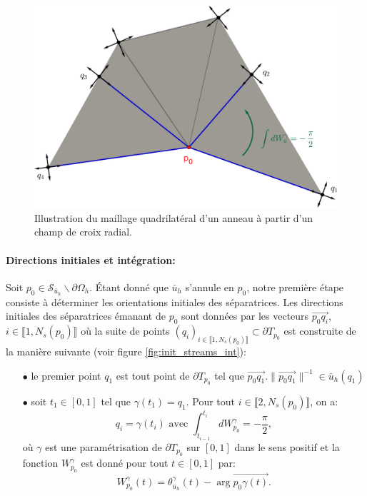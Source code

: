 \begin{figure}[!h]
\centering
\includegraphics[scale=0.755]{images/triangle separatrices bord.png}
\caption{Illustration du maillage quadrilatéral d'un anneau à partir d'un champ de croix radial.}
\label{fig:init_streams_bord}
\end{figure}

\paragraph{Directions initiales et intégration:}

Soit $p_0\in\mathcal{S}_{\bar{u}_h}\backslash\partial\Omega_h$. Étant donné que $\bar{u}_h$ s'annule en $p_0$, notre première étape consiste à déterminer les orientations initiales des séparatrices. Les directions initiales des séparatrices émanant de $p_0$ sont données par les vecteurs $\overrightarrow{p_0q_i}$, $i\in\llbracket 1, N_s(p_0) \rrbracket$ où la suite de points $(q_i)_{i\in\llbracket 1, N_s(p_0)\rrbracket}\subset\partial T_{p_0}$ est construite de la manière suivante (voir figure \ref{fig:init_streams_int}):\\
\begin{itemize}
    \item[$\bullet$] le premier point $q_1$ est tout point de $\partial T_{p_0}$ tel que $\overrightarrow{p_0q_1}.\|\overrightarrow{p_0q_1}\|^{-1}\in\bar{u}_h(q_1)$\\
    \item[$\bullet$] soit $t_1\in[0, 1]$ tel que $\gamma(t_1)=q_1$. Pour tout $i\in\llbracket 2, N_s(p_0)\rrbracket$, on a:
    $$
    q_i=\gamma(t_i)\mbox{ avec }\int_{t_{i-1}}^{t_i}dW_{p_0}^\gamma=-\frac{\pi}{2},
    $$
    où $\gamma$ est une paramétrisation de $\partial T_{p_0}$ sur $[0, 1]$ dans le sens positif et la fonction $W^\gamma_{p_0}$ est donné pour tout $t\in[0, 1]$ par:
    $$
    W_{p_0}^\gamma(t)=\theta^\gamma_{\bar{u}_h}(t)-\arg \overrightarrow{p_0\gamma(t)}.
    $$
\end{itemize}

